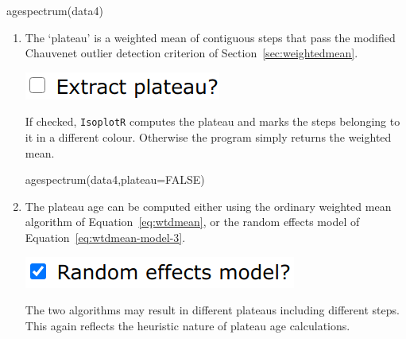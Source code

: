 \begin{refsection}
\begin{console}
agespectrum(data4)
\end{console}

\begin{enumerate}

\item The `plateau' is a weighted mean of contiguous steps that pass
  the modified Chauvenet outlier detection criterion of
  Section~\ref{sec:weightedmean}.

\noindent\begin{minipage}[t]{.2\linewidth}
  \strut\vspace*{-\baselineskip}\newline
  \includegraphics[width=\linewidth]{../figures/OtherAgeSpectrumPlateau.png}
\end{minipage}
\begin{minipage}[t]{.8\linewidth}
If checked, \texttt{IsoplotR} computes the plateau and marks the steps
belonging to it in a different colour. Otherwise the program simply
returns the weighted mean.
\end{minipage}

\begin{console}
agespectrum(data4,plateau=FALSE)
\end{console}

\item The plateau age can be computed either using the ordinary
  weighted mean algorithm of Equation~\ref{eq:wtdmean}, or the random
  effects model of Equation~\ref{eq:wtdmean-model-3}.

\noindent\begin{minipage}[t]{.28\linewidth}
  \strut\vspace*{-\baselineskip}\newline
  \includegraphics[width=\linewidth]{../figures/OtherAgeSpectrumRandomEffects.png}
\end{minipage}
\begin{minipage}[t]{.68\linewidth}
  The two algorithms may result in different plateaus including
  different steps. This again reflects the heuristic nature of plateau
  age calculations.
\end{minipage}


\end{enumerate}
\end{refsection}

